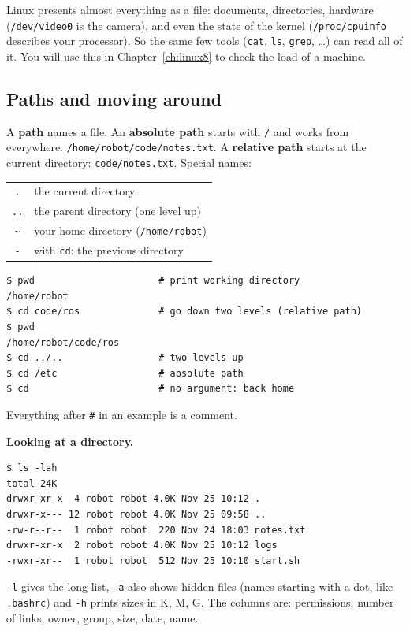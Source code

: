 \begin{keyidea}
Linux presents almost everything as a file: documents, directories, hardware (\texttt{/dev/video0} is the camera), and even the state of the kernel (\texttt{/proc/cpuinfo} describes your processor). So the same few tools (\texttt{cat}, \texttt{ls}, \texttt{grep}, \dots) can read all of it. You will use this in Chapter~\ref{ch:linux8} to check the load of a machine.
\end{keyidea}

\subsection*{Paths and moving around}
A \textbf{path} names a file. An \textbf{absolute path} starts with \texttt{/} and works from everywhere: \texttt{/home/robot/code/notes.txt}. A \textbf{relative path} starts at the current directory: \texttt{code/notes.txt}. Special names:
\begin{center}
\renewcommand{\arraystretch}{1.15}
\begin{tabular}{cl}
\texttt{.} & the current directory\\
\texttt{..} & the parent directory (one level up)\\
\texttt{\textasciitilde} & your home directory (\texttt{/home/robot})\\
\texttt{-} & with \texttt{cd}: the previous directory\\
\end{tabular}
\end{center}
\begin{verbatim}
$ pwd                      # print working directory
/home/robot
$ cd code/ros              # go down two levels (relative path)
$ pwd
/home/robot/code/ros
$ cd ../..                 # two levels up
$ cd /etc                  # absolute path
$ cd                       # no argument: back home
\end{verbatim}
Everything after \texttt{\#} in an example is a comment.

\textbf{Looking at a directory.}
\begin{verbatim}
$ ls -lah
total 24K
drwxr-xr-x  4 robot robot 4.0K Nov 25 10:12 .
drwxr-x--- 12 robot robot 4.0K Nov 25 09:58 ..
-rw-r--r--  1 robot robot  220 Nov 24 18:03 notes.txt
drwxr-xr-x  2 robot robot 4.0K Nov 25 10:12 logs
-rwxr-xr--  1 robot robot  512 Nov 25 10:10 start.sh
\end{verbatim}
\texttt{-l} gives the long list, \texttt{-a} also shows hidden files (names starting with a dot, like \texttt{.bashrc}) and \texttt{-h} prints sizes in K, M, G. The columns are: permissions, number of links, owner, group, size, date, name.

